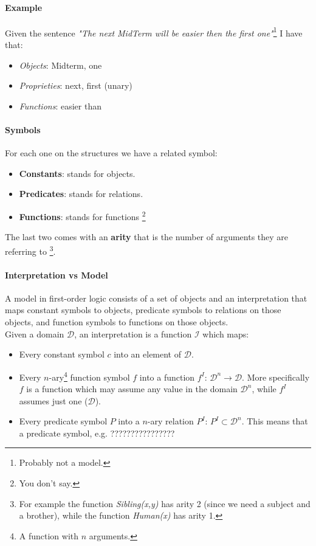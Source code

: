 \documentclass[10pt,a4paper]{article}
\begin{document}
\paragraph{Example}
Given the sentence \textit{"The next MidTerm will be easier then the first one"}\footnote{Probably not a model.} I have that:
\begin{itemize}
\item \textit{Objects}: Midterm, one
\item \textit{Proprieties}: next, first (unary)
\item \textit{Functions}: easier than
\end{itemize}


\paragraph{Symbols} For each one on the structures we have a related symbol:
\begin{itemize}
\item \textbf{Constants}: stands for objects.
\item \textbf{Predicates}: stands for relations.
\item \textbf{Functions}: stands for functions \footnote{You don't say.}
\end{itemize}
The last two comes with an \textbf{arity} that is the number of arguments they are referring to \footnote{For example the function \textit{Sibling(x,y)} has arity 2 (since we need a subject and a brother), while the function \textit{Human(x)} has arity 1.}.

\paragraph{Interpretation vs Model}
A model in first-order logic consists of a set of objects and an interpretation that maps constant symbols to objects, predicate symbols to relations on those objects, and function symbols to functions on those objects.\\
Given a domain $\mathcal{D}$, an interpretation is a function $\mathcal{I}$ which maps:
\begin{itemize}
\item Every constant symbol $c$ into an element of $\mathcal{D}$.
\item Every $n$-ary\footnote{A function with $n$ arguments.} function symbol $f$ into a  function $f^I$: $\mathcal{D}^n\rightarrow \mathcal{D}$. More specifically $f$ is a function which may assume any value in the domain $\mathcal{D}^n$, while $f^I$ assumes just one ($\mathcal{D}$).
\item Every predicate symbol $P$ into a  $n$-ary relation $P^I$: $P^I\subset \mathcal{D}^n$. This means that a predicate symbol, e.g. ????????????????
\end{itemize}
\end{document}
